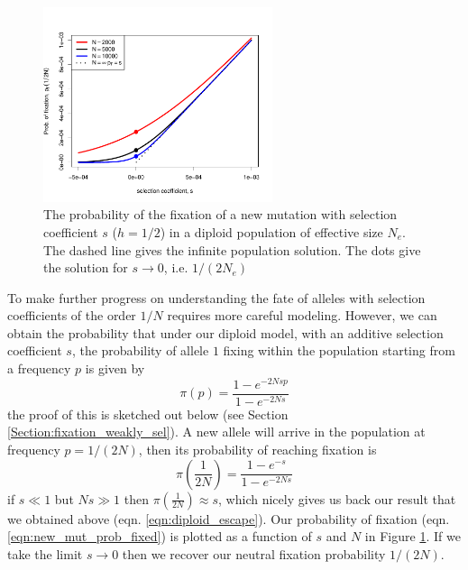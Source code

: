 \begin{figure}
\begin{center}
\includegraphics[width=0.6\textwidth]{figures/prob_fix_diffusion.pdf}
\end{center}
\caption{The probability of the fixation of a new mutation with
  selection coefficient $s$ ($h=1/2$) in a diploid population of effective
  size $N_e$. The dashed line gives the infinite population
  solution. The dots give the solution for $s \rightarrow 0$, i.e. $1/(2N_e)$} \label{fig:prob_fix_diffusion}
\end{figure}

To make further progress on understanding the fate of alleles with
selection coefficients of the order $1/N$ requires more careful
modeling. However, we can obtain the probability that under our diploid model, with an additive selection coefficient $s$, the
probability of allele $1$ fixing within the population starting
from a frequency $p$ is given by
\begin{equation}
\pi(p) = \frac{1-e^{-2Ns p }}{1-e^{-2Ns}} \label{eqn:prob_fixed}
\end{equation}
the proof of this is sketched out below (see Section \ref{Section:fixation_weakly_sel}). A new allele will arrive in the population at frequency $p=1/(2N)$,
then its probability of reaching fixation is
\begin{equation}
\pi \left(\frac{1}{2N} \right) = \frac{1-e^{-s }}{1-e^{-2Ns}} \label{eqn:new_mut_prob_fixed}
\end{equation}
if $s \ll1$ but $Ns \gg 1$ then $\pi(\frac{1}{2N}) \approx s$, which
nicely gives
us back our result that we obtained above
(eqn. \eqref{eqn:diploid_escape}). Our probability of fixation
(eqn. \eqref{eqn:new_mut_prob_fixed}) is plotted as a function of $s$
and $N$ in Figure \ref{fig:prob_fix_diffusion}. If we take the
limit $s \rightarrow 0$ then we recover our neutral fixation
probability $1/(2N)$. \\

